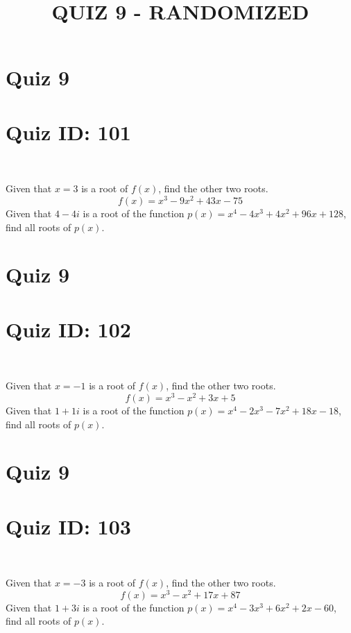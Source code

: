 \documentclass{exam}
\title{QUIZ 9 - RANDOMIZED}
\begin{document}
\newpage
\section*{Quiz 9}
\section*{Quiz ID: 101}
\vspace{0.5cm}\
\vspace{1cm}\
\begin{questions}
\question Given that $x=3$ is a root of $f(x)$, find the other two roots.\[f(x)=
x^3 - 9x^2 + 43x - 75\]
\newpage
\question Given that $4-4\mathit{i}$ is a root of the function $p(x)=
x^4 - 4x^3 + 4x^2 + 96x + 128$, find all roots of $p(x)$. 
\end{questions}\newpage
\newpage
\section*{Quiz 9}
\section*{Quiz ID: 102}
\vspace{0.5cm}\
\vspace{1cm}\
\begin{questions}
\question Given that $x=-1$ is a root of $f(x)$, find the other two roots.\[f(x)=
x^3 - x^2 + 3x + 5\]
\newpage
\question Given that $1+1\mathit{i}$ is a root of the function $p(x)=
x^4 - 2x^3 - 7x^2 + 18x - 18$, find all roots of $p(x)$. \makeemptybox{\stretch{1}}
\end{questions}\newpage
\newpage
\section*{Quiz 9}
\section*{Quiz ID: 103}
\vspace{0.5cm}\
\vspace{1cm}\
\begin{questions}
\question Given that $x=-3$ is a root of $f(x)$, find the other two roots.\[f(x)=
x^3 - x^2 + 17x + 87\]
\newpage
\question Given that $1+3\mathit{i}$ is a root of the function $p(x)=
x^4 - 3x^3 + 6x^2 + 2x - 60$, find all roots of $p(x)$. \makeemptybox{\stretch{1}}
\end{questions}\newpage
\newpage
\end{document}
